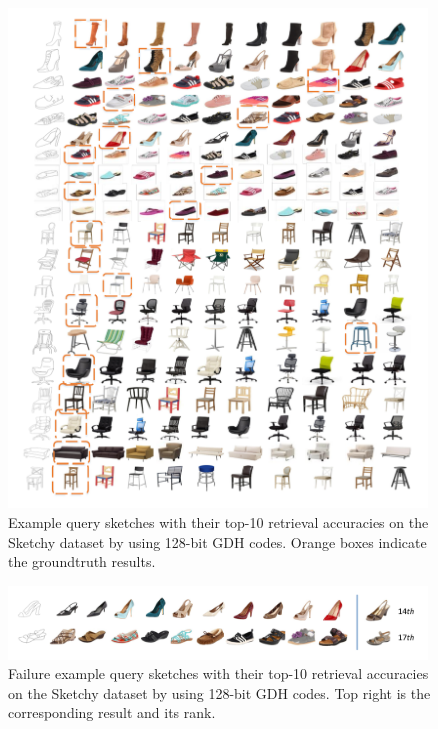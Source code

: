 \documentclass[runningheads]{llncs}
\begin{document}
\begin{figure}
\vspace{-5ex}
    \centering
    \includegraphics[width = 0.99\textwidth]{figs/fg_results.pdf}
    \vspace{-3ex}
    \caption{Example query sketches with their top-10 retrieval accuracies on the Sketchy
dataset by using 128-bit GDH codes. Orange boxes indicate the groundtruth results.}
    \label{fig:fg_results}
    \vspace{-5ex}
\end{figure}


\begin{figure}
\vspace{-5ex}
    \centering
    \includegraphics[width = 0.99\textwidth]{figs/failure_cases.pdf}
    \vspace{-3ex}
    \caption{Failure example query sketches with their top-10 retrieval accuracies on the Sketchy
dataset by using 128-bit GDH codes. Top right is the corresponding result and its rank.}
    \label{fig:failure_cases}
    \vspace{-5ex}
\end{figure}




\end{document}
